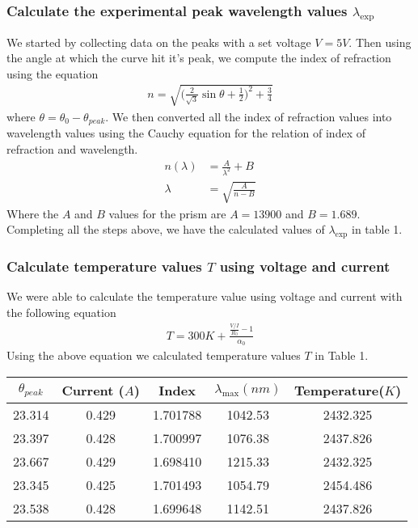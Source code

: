 \documentclass{article}
\begin{document}
\subsubsection*{Calculate the experimental peak wavelength values $\lambda_{\exp}$}
We started by collecting data on the peaks with a set voltage $V = 5V$. Then
using the angle at which the curve hit it's peak, we compute the index of refraction
using the equation
\begin{align*}
    n = \sqrt{\bigg(\frac{2}{\sqrt{3}} \sin\theta + \frac{1}{2}\bigg)^2 + \frac{3}{4}}
\end{align*}
where $\theta = \theta_0 - \theta_{peak}$. We then converted all the index of
refraction values into wavelength values using the Cauchy equation for the relation
of index of refraction and wavelength.
\begin{align*}
    n(\lambda) &= \frac{A}{\lambda^2} + B\\
    \lambda &= \sqrt{\frac{A}{n - B}}
\end{align*}
Where the $A$ and $B$ values for the prism are $A = 13900$ and $B = 1.689$. 
Completing all the steps above, we have the calculated values of $\lambda_{\exp}$
in table 1.

\subsubsection*{Calculate temperature values $T$ using voltage and current}
We were able to calculate the temperature value using voltage and current with
the following equation
\begin{align*}
    T = 300K + \frac{\frac{V / I}{R_0} - 1}{\alpha_0}
\end{align*}
Using the above equation we calculated temperature values $T$ in Table 1.
\begin{center}
    \begin{tabular}{ c | c | c | c | c}
    $\theta_{peak}$ & Current ($A$) & Index & $\lambda_{\max} (nm)$ & Temperature($K$)\\
    \hline 
    23.314  &  0.429  &  1.701788  &  1042.53  &  2432.325 \\
    23.397  &  0.428  &  1.700997  &  1076.38  &  2437.826 \\
    23.667  &  0.429  &  1.698410  &  1215.33  &  2432.325 \\
    23.345  &  0.425  &  1.701493  &  1054.79  &  2454.486 \\
    23.538  &  0.428  &  1.699648  &  1142.51  &  2437.826 
    \end{tabular}
\end{center}
\newpage
\end{document}
